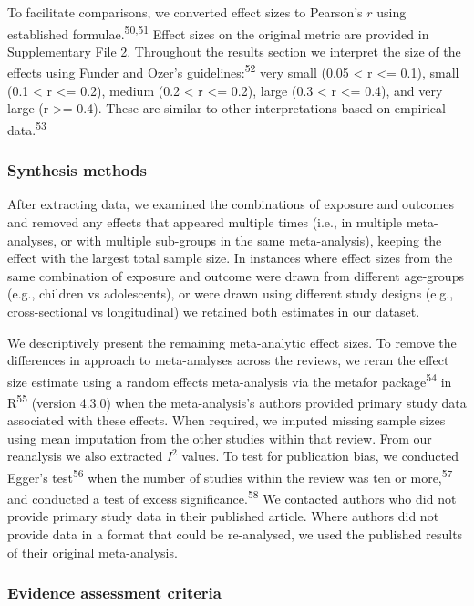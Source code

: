 \documentclass[
  english,
  man]{apa6}
\begin{document}
To facilitate comparisons, we converted effect sizes to Pearson's \(r\) using established formulae.\textsuperscript{50,51}
Effect sizes on the original metric are provided in Supplementary File 2.
Throughout the results section we interpret the size of the effects using Funder and Ozer's guidelines:\textsuperscript{52} very small (0.05 \textless{} r \textless= 0.1), small (0.1 \textless{} r \textless= 0.2), medium (0.2 \textless{} r \textless= 0.2), large (0.3 \textless{} r \textless= 0.4), and very large (r \textgreater= 0.4).
These are similar to other interpretations based on empirical data.\textsuperscript{53}

\hypertarget{synthesis-methods}{%
\subsubsection{Synthesis methods}\label{synthesis-methods}}

After extracting data, we examined the combinations of exposure and outcomes and removed any effects that appeared multiple times (i.e., in multiple meta-analyses, or with multiple sub-groups in the same meta-analysis), keeping the effect with the largest total sample size.
In instances where effect sizes from the same combination of exposure and outcome were drawn from different age-groups (e.g., children vs adolescents), or were drawn using different study designs (e.g., cross-sectional vs longitudinal) we retained both estimates in our dataset.

We descriptively present the remaining meta-analytic effect sizes.
To remove the differences in approach to meta-analyses across the reviews, we reran the effect size estimate using a random effects meta-analysis via the metafor package\textsuperscript{54} in R\textsuperscript{55} (version 4.3.0) when the meta-analysis's authors provided primary study data associated with these effects.
When required, we imputed missing sample sizes using mean imputation from the other studies within that review.
From our reanalysis we also extracted \(I^2\) values.
To test for publication bias, we conducted Egger's test\textsuperscript{56} when the number of studies within the review was ten or more,\textsuperscript{57} and conducted a test of excess significance.\textsuperscript{58}
We contacted authors who did not provide primary study data in their published article.
Where authors did not provide data in a format that could be re-analysed, we used the published results of their original meta-analysis.

\hypertarget{evidence-assessment-criteria}{%
\subsubsection{Evidence assessment criteria}\label{evidence-assessment-criteria}}
\end{document}
